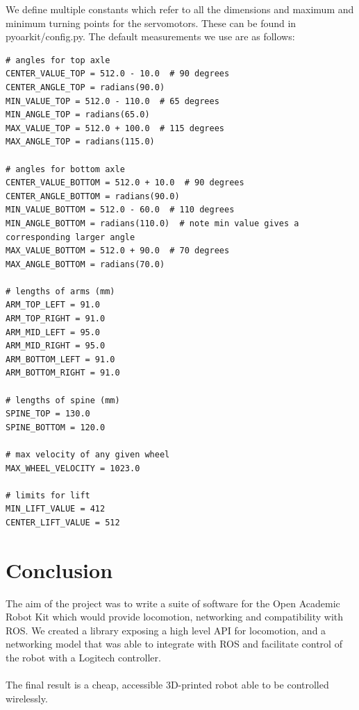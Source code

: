 \documentclass[]{article}
\begin{document}
We define multiple constants which refer to all the dimensions and maximum and minimum turning points for the servomotors. These can be found in pyoarkit/config.py. The default measurements we use are as follows:
\lstset{language=Python}
\begin{lstlisting}
# angles for top axle
CENTER_VALUE_TOP = 512.0 - 10.0  # 90 degrees
CENTER_ANGLE_TOP = radians(90.0)
MIN_VALUE_TOP = 512.0 - 110.0  # 65 degrees
MIN_ANGLE_TOP = radians(65.0)
MAX_VALUE_TOP = 512.0 + 100.0  # 115 degrees
MAX_ANGLE_TOP = radians(115.0)

# angles for bottom axle
CENTER_VALUE_BOTTOM = 512.0 + 10.0  # 90 degrees
CENTER_ANGLE_BOTTOM = radians(90.0)
MIN_VALUE_BOTTOM = 512.0 - 60.0  # 110 degrees
MIN_ANGLE_BOTTOM = radians(110.0)  # note min value gives a corresponding larger angle
MAX_VALUE_BOTTOM = 512.0 + 90.0  # 70 degrees
MAX_ANGLE_BOTTOM = radians(70.0)

# lengths of arms (mm)
ARM_TOP_LEFT = 91.0
ARM_TOP_RIGHT = 91.0
ARM_MID_LEFT = 95.0
ARM_MID_RIGHT = 95.0
ARM_BOTTOM_LEFT = 91.0
ARM_BOTTOM_RIGHT = 91.0

# lengths of spine (mm)
SPINE_TOP = 130.0
SPINE_BOTTOM = 120.0

# max velocity of any given wheel
MAX_WHEEL_VELOCITY = 1023.0

# limits for lift
MIN_LIFT_VALUE = 412
CENTER_LIFT_VALUE = 512
\end{lstlisting}

\section{Conclusion}
The aim of the project was to write a suite of software for the Open Academic Robot Kit which would provide locomotion, networking and compatibility with ROS. We created a library exposing a high level API for locomotion, and a networking model that was able to integrate with ROS and facilitate control of the robot with a Logitech controller.
\\
\\
The final result is a cheap, accessible 3D-printed robot able to be controlled wirelessly.
\end{document}
